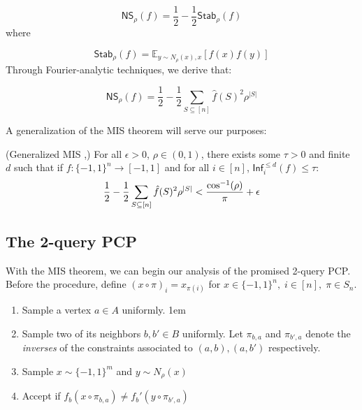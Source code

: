 \begin{equation}
  \mathsf{NS}_\rho(f) = \frac{1}{2} - \frac{1}{2}\mathsf{Stab}_\rho(f)
\end{equation}
where

\begin{equation*}
  \mathsf{Stab}_\rho(f) = \mathbb{E}_{y \sim N_{\rho}(x), x}[f(x)f(y)]
\end{equation*}
Through Fourier-analytic techniques, we derive that:

\begin{equation}
  \mathsf{NS}_\rho(f) = \frac{1}{2} - \frac{1}{2}\sum_{S\subseteq [n]}\hat{f}(S)^2\rho^{|S|}
\end{equation}

A generalization of the MIS theorem will serve our purposes:

\begin{theorem} \label{generalMIS} (Generalized MIS \cite{khot2007optimal},\cite{mossel2005noise})
  For all $\epsilon > 0$, $\rho \in (0,1)$, there exists some $\tau > 0$ and finite $d$ such that if $f:\{-1,1\}^n \rightarrow [-1,1]$ and for all $i \in [n]$, $\mathsf{Inf}^{\leq d}_i(f) \leq \tau$:
  \begin{equation}
    \frac{1}{2} - \frac{1}{2}\sum_{S\subseteq [n]}\hat{f}(S)^2\rho^{|S|} < \frac{\cos^{-1}(\rho)}{\pi} + \epsilon
  \end{equation}
\end{theorem}

%
%
%
\subsection{The 2-query PCP}
With the MIS theorem, we can begin our analysis of the promised 2-query PCP. Before the procedure, define $(x \circ \pi)_i = x_{\pi(i)}$ for $x \in \{-1,1\}^n, \; i \in [n], \; \pi \in S_n$.  \newline

\begin{enumerate}
  \item Sample a vertex $a \in A$ uniformly.
  \itemsep1em
  \item Sample two of its neighbors $b,b' \in B$ uniformly. Let $\pi_{b,a}$ and $\pi_{b',a}$ denote the \emph{inverses} of the constraints associated to $(a,b), (a,b')$ respectively.
  \item Sample $x \sim \{-1,1\}^m$ and $y \sim N_\rho(x)$
  \item Accept if $f_b(x \circ \pi_{b,a}) \neq f_b'(y \circ \pi_{b',a})$
\end{enumerate}

